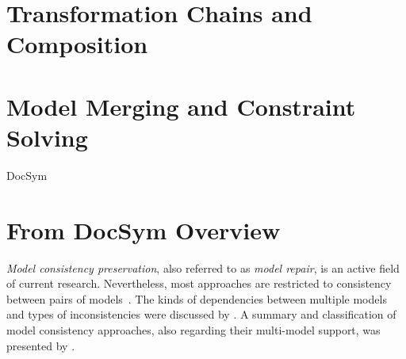 \section{Transformation Chains and Composition}

\section{Model Merging and Constraint Solving}




\begin{copiedFrom}{DocSym}

\section*{From DocSym Overview}
\emph{Model consistency preservation}, also referred to as %
\emph{model repair}, is an active field of current research. 
Nevertheless, most approaches are restricted to consistency between pairs of models~\cite{stevens2020BidirectionalTransformationLarge-SoSym}.
The kinds of dependencies between multiple models and types of inconsistencies were discussed by \textcite{kolovos2008a}. 
A summary and classification of model consistency approaches, also regarding their multi-model support, was presented by \textcite{macedo2015a}.


\end{copiedFrom}
